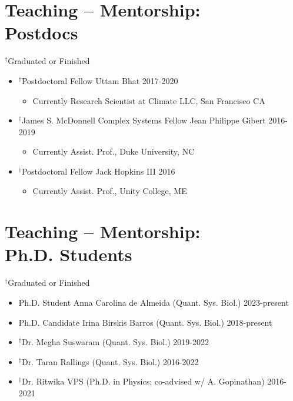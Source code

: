 \documentclass[margin,line,12pt]{res}
\begin{document}
\begin{resume}
\section{\sc Teaching -- Mentorship: \\ Postdocs}
{\footnotesize{${}^\dag$Graduated or Finished}}
\begin{itemize}
\item ${}^\dag$Postdoctoral Fellow Uttam Bhat \hfill 2017-2020
	\begin{itemize}  
		\item[] Currently Research Scientist at Climate LLC, San Francisco CA
	\end{itemize}
\item ${}^\dag$James S. McDonnell Complex Systems Fellow Jean Philippe Gibert \hfill 2016-2019
	\begin{itemize}  
		\item[] Currently Assist. Prof., Duke University, NC
	\end{itemize}  
\item ${}^\dag$Postdoctoral Fellow Jack Hopkins III \hfill 2016
	\begin{itemize}  
		\item[] Currently Assist. Prof., Unity College, ME
	\end{itemize}  
\end{itemize}

\section{\sc Teaching -- Mentorship: \\ Ph.D. Students}
{\footnotesize{${}^\dag$Graduated or Finished}}
\begin{itemize}
  \item Ph.D. Student Anna Carolina de Almeida (Quant. Sys. Biol.) \hfill 2023-present
  \item Ph.D. Candidate Irina Birskis Barros (Quant. Sys. Biol.) \hfill 2018-present
  \item ${}^\dag$Dr. Megha Suswaram (Quant. Sys. Biol.) \hfill 2019-2022
  \item ${}^\dag$Dr. Taran Rallings (Quant. Sys. Biol.) \hfill 2016-2022
  \item ${}^\dag$Dr. Ritwika VPS (Ph.D. in Physics; co-advised w/ A. Gopinathan) \hfill 2016-2021


\end{itemize}



\end{resume}
\end{document}
